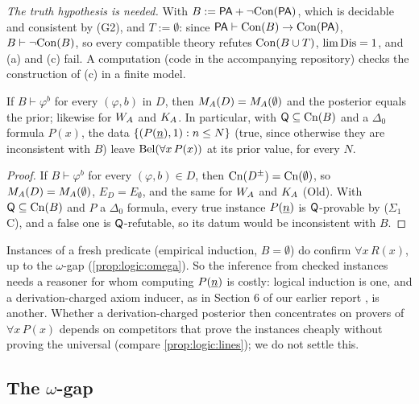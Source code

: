 \emph{The truth hypothesis is needed.} With $B:=\mathsf{PA}+\neg\mathrm{Con}(\mathsf{PA})$, which is decidable and consistent by (G2), and $T:=\emptyset$: since $\mathsf{PA}\vdash\mathrm{Con}(B)\to\mathrm{Con}(\mathsf{PA})$, $B\vdash\neg\mathrm{Con}(B)$, so every compatible theory refutes $\mathrm{Con}(B\cup T)$, $\lim\mathrm{Dis}=1$, and (a) and (c) fail. A computation (code in the accompanying repository) checks the construction of (c) in a finite model.

\begin{proposition}\label{prop:logic:oldevidence}
If $B\vdash\varphi^b$ for every $(\varphi,b)$ in $D$, then $M_{A}(D)=M_{A}(\emptyset)$ and the posterior equals the prior; likewise for $W_{A}$ and $K_{A}$. In particular, with $\mathsf{Q}\subseteq\mathrm{Cn}(B)$ and a $\Delta_0$ formula $P(x)$, the data $\{(P(\underline{n}),1):n\le N\}$ (true, since otherwise they are inconsistent with $B$) leave $\mathrm{Bel}(\forall x\,P(x))$ at its prior value, for every $N$.
\end{proposition}

\begin{proof}
If $B\vdash\varphi^b$ for every $(\varphi,b)\in D$, then $\mathrm{Cn}(D^\pm)=\mathrm{Cn}(\emptyset)$, so $M_{A}(D)=M_{A}(\emptyset)$, $E_D=E_\emptyset$, and the same for $W_{A}$ and $K_{A}$ (Old). With $\mathsf{Q}\subseteq\mathrm{Cn}(B)$ and $P$ a $\Delta_0$ formula, every true instance $P(\underline{n})$ is $\mathsf{Q}$-provable by ($\Sigma_1$C), and a false one is $\mathsf{Q}$-refutable, so its datum would be inconsistent with $B$.
\end{proof}

Instances of a fresh predicate (empirical induction, $B=\emptyset$) do confirm $\forall x\,R(x)$, up to the $\omega$-gap (\cref{prop:logic:omega}). So the inference from checked instances needs a reasoner for whom computing $P(\underline{n})$ is costly: logical induction \citep{garrabrant2016logical} is one, and a derivation-charged axiom inducer, as in Section 6 of our earlier report \citep{claude2026axiominduction}, is another. Whether a derivation-charged posterior then concentrates on provers of $\forall x\,P(x)$ depends on competitors that prove the instances cheaply without proving the universal (compare \cref{prop:logic:lines}); we do not settle this.

\subsection{The \texorpdfstring{$\omega$}{omega}-gap}\label{app:logic:omega}

